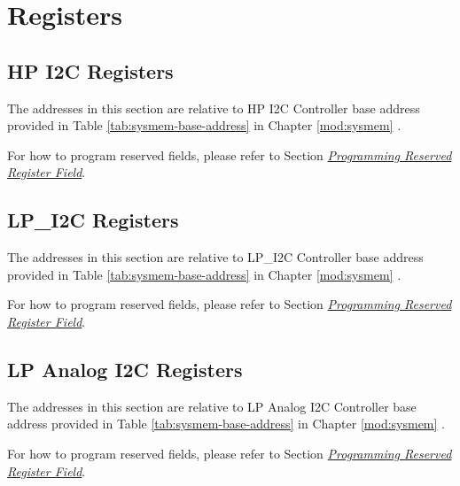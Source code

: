 \documentclass[main\_\_EN.tex]{subfiles}
\begin{document}
\newpage
\section{Registers}

\subsection{HP I2C Registers}

The addresses in this section are relative to HP I2C Controller base address provided in Table \ref{tab:sysmem-base-address} in Chapter \ref{mod:sysmem} \textit{}.

For how to program reserved fields, please refer to Section \hyperref[programming-reserved-field]{\textit{Programming Reserved Register Field}}.



\subsection{LP\_I2C Registers}

The addresses in this section are relative to LP\_I2C Controller base address provided in Table \ref{tab:sysmem-base-address} in Chapter \ref{mod:sysmem} \textit{}.

For how to program reserved fields, please refer to Section \hyperref[programming-reserved-field]{\textit{Programming Reserved Register Field}}.



\subsection{LP Analog I2C Registers}

The addresses in this section are relative to LP Analog I2C Controller base address provided in Table \ref{tab:sysmem-base-address} in Chapter \ref{mod:sysmem} \textit{}.

For how to program reserved fields, please refer to Section \hyperref[programming-reserved-field]{\textit{Programming Reserved Register Field}}.


\end{document}
